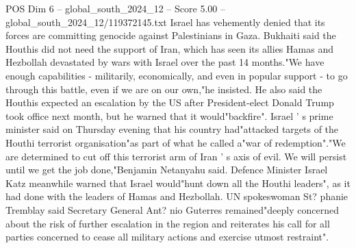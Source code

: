 \begin{textsample}{POS Dim 6 – global\_south\_2024\_12 – Score 5.00 – global\_south\_2024\_12/119372145.txt}
Israel has vehemently denied that its forces are committing genocide against Palestinians in Gaza.
Bukhaiti said the Houthis did not need the support of Iran, which has seen its allies Hamas and Hezbollah devastated by wars with Israel over the past 14 months."We have enough capabilities - militarily, economically, and even in popular support - to go through this battle, even if we are on our own,"he insisted.
He also said the Houthis expected an escalation by the US after President-elect Donald Trump took office next month, but he warned that it would"backfire".
Israel ' s prime minister said on Thursday evening that his country had"attacked targets of the Houthi terrorist organisation"as part of what he called a"war of redemption"."We are determined to cut off this terrorist arm of Iran ' s axis of evil.
We will persist until we get the job done,"Benjamin Netanyahu said.
Defence Minister Israel Katz meanwhile warned that Israel would"hunt down all the Houthi leaders", as it had done with the leaders of Hamas and Hezbollah.
UN spokeswoman St? phanie Tremblay said Secretary General Ant? nio Guterres remained"deeply concerned about the risk of further escalation in the region and reiterates his call for all parties concerned to cease all military actions and exercise utmost restraint".

\end{textsample}

